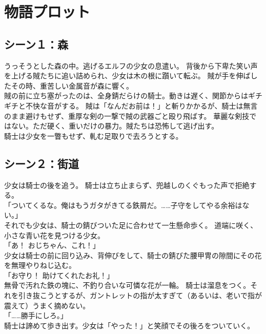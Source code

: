 \section{物語プロット}
\subsection{シーン１：森}
うっそうとした森の中。逃げるエルフの少女の息遣い。
背後から下卑た笑い声を上げる賊たちに追い詰められ、少女は木の根に躓いて転ぶ。
賊が手を伸ばしたその時、重苦しい金属音が森に響く。\\
賊の前に立ち塞がったのは、全身錆だらけの騎士。動きは遅く、関節からはギチギチと不快な音がする。
賊は「なんだお前は！」と斬りかかるが、騎士は無言のまま避けもせず、重厚な剣の一撃で賊の武器ごと殴り飛ばす。
華麗な剣技ではない。ただ硬く、重いだけの暴力。賊たちは恐怖して逃げ出す。\\
騎士は少女を一瞥もせず、軋む足取りで去ろうとする。

\subsection{シーン２：街道}
少女は騎士の後を追う。
騎士は立ち止まらず、兜越しのくぐもった声で拒絶する。
\\「ついてくるな。俺はもうガタがきてる鉄屑だ。……子守をしてやる余裕はない。」\\
それでも少女は、騎士の錆びついた足に合わせて一生懸命歩く。
道端に咲く、小さな青い花を見つける少女。
\\「あ！ おじちゃん、これ！」\\
少女は騎士の前に回り込み、背伸びをして、騎士の錆びた腰甲冑の隙間にその花を無理やりねじ込む。
\\「お守り！ 助けてくれたお礼！」\\
無骨で汚れた鉄の塊に、不釣り合いな可憐な花が一輪。
騎士は溜息をつく。それを引き抜こうとするが、ガントレットの指が太すぎて（あるいは、老いで指が震えて）うまく摘めない。
\\「……勝手にしろ。」\\
騎士は諦めて歩き出す。少女は「やった！」と笑顔でその後ろをついていく。

